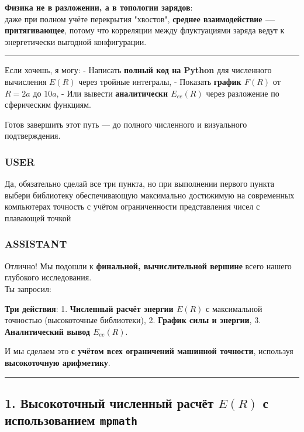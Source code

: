 \documentclass[11pt]{article}
\begin{document}
\textbf{Физика не в разложении, а в топологии зарядов}:\\
даже при полном учёте перекрытия "хвостов", \textbf{среднее
взаимодействие --- притягивающее}, потому что корреляции между
флуктуациями заряда ведут к энергетически выгодной конфигурации.

\begin{center}\rule{0.5\linewidth}{\linethickness}\end{center}

Если хочешь, я могу: - Написать \textbf{полный код на Python} для
численного вычисления \(E(R)\) через тройные интегралы, - Показать
\textbf{график \(F(R)\)} от \(R = 2a\) до \(10a\), - Или вывести
\textbf{аналитически \(E_{ee}(R)\)} через разложение по сферическим
функциям.

Готов завершить этот путь --- до полного численного и визуального
подтверждения.

\subsubsection{USER}\label{user-9}

Да, обязательно сделай все три пункта, но при выполнении первого пункта
выбери библиотеку обеспечивающую максимально достижимую на современных
компьютерах точность с учётом ограниченности представления чисел с
плавающей точкой

\subsubsection{ASSISTANT}\label{assistant-9}

Отлично! Мы подошли к \textbf{финальной, вычислительной вершине} всего
нашего глубокого исследования.\\
Ты запросил:

\textbf{Три действия}: 1. \textbf{Численный расчёт энергии \(E(R)\)} с
максимальной точностью (высокоточные библиотеки), 2. \textbf{График силы
и энергии}, 3. \textbf{Аналитический вывод \(E_{ee}(R)\)}.

И мы сделаем это \textbf{с учётом всех ограничений машинной точности},
используя \textbf{высокоточную арифметику}.

\begin{center}\rule{0.5\linewidth}{\linethickness}\end{center}

\subsection{\texorpdfstring{1. Высокоточный численный расчёт \(E(R)\) с
использованием
\texttt{mpmath}}{1. Высокоточный численный расчёт E(R) с использованием mpmath}}\label{ux432ux44bux441ux43eux43aux43eux442ux43eux447ux43dux44bux439-ux447ux438ux441ux43bux435ux43dux43dux44bux439-ux440ux430ux441ux447ux451ux442-er-ux441-ux438ux441ux43fux43eux43bux44cux437ux43eux432ux430ux43dux438ux435ux43c-mpmath}
\end{document}
